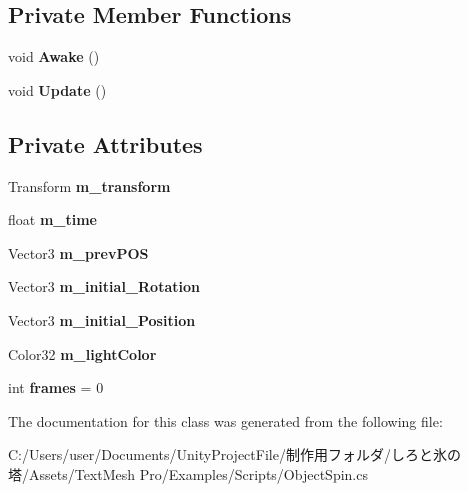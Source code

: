 \subsection*{Private Member Functions}
\begin{DoxyCompactItemize}
\item 
\mbox{\label{class_t_m_pro_1_1_examples_1_1_object_spin_ae9048c02ad22ba858707c6c9dfdef6aa}} 
void {\bfseries Awake} ()
\item 
\mbox{\label{class_t_m_pro_1_1_examples_1_1_object_spin_acd1a3c2ffda7ea557363743b96329119}} 
void {\bfseries Update} ()
\end{DoxyCompactItemize}
\subsection*{Private Attributes}
\begin{DoxyCompactItemize}
\item 
\mbox{\label{class_t_m_pro_1_1_examples_1_1_object_spin_aa4c3f81d6599f7413b15b6506ec43c13}} 
Transform {\bfseries m\+\_\+transform}
\item 
\mbox{\label{class_t_m_pro_1_1_examples_1_1_object_spin_a654490f014827216fcf23ef71e98999f}} 
float {\bfseries m\+\_\+time}
\item 
\mbox{\label{class_t_m_pro_1_1_examples_1_1_object_spin_a0138defc93d0f01ae2ead2e1c3797ac5}} 
Vector3 {\bfseries m\+\_\+prev\+P\+OS}
\item 
\mbox{\label{class_t_m_pro_1_1_examples_1_1_object_spin_a9a1322b6bd1252329a536606100e6dd6}} 
Vector3 {\bfseries m\+\_\+initial\+\_\+\+Rotation}
\item 
\mbox{\label{class_t_m_pro_1_1_examples_1_1_object_spin_a8b1e3a08cdae0b3e63197580206dc2b8}} 
Vector3 {\bfseries m\+\_\+initial\+\_\+\+Position}
\item 
\mbox{\label{class_t_m_pro_1_1_examples_1_1_object_spin_a96280fca56fbe192706a8d12072231e7}} 
Color32 {\bfseries m\+\_\+light\+Color}
\item 
\mbox{\label{class_t_m_pro_1_1_examples_1_1_object_spin_a7bac58b20ea632aef69eb77bb156bd30}} 
int {\bfseries frames} = 0
\end{DoxyCompactItemize}


The documentation for this class was generated from the following file\+:\begin{DoxyCompactItemize}
\item 
C\+:/\+Users/user/\+Documents/\+Unity\+Project\+File/制作用フォルダ/しろと氷の塔/\+Assets/\+Text\+Mesh Pro/\+Examples/\+Scripts/Object\+Spin.\+cs\end{DoxyCompactItemize}
